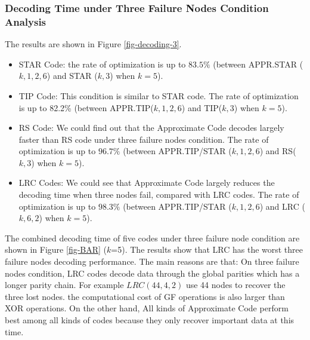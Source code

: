 \documentclass[sigconf]{acmart}
\begin{document}
\subsubsection{Decoding Time under Three Failure Nodes Condition Analysis}
The results are shown in Figure \ref{fig-decoding-3}.
\begin{itemize}
    \item STAR Code: the rate of optimization is up to $83.5\%$ (between APPR.STAR ($k,1,2,6$) and STAR ($k,3$) when $k = 5$).
    \item TIP Code: This condition is similar to STAR code. The rate of optimization is up to 82.2\% (between APPR.TIP($k,1,2,6$) and TIP($k,3$) when $k = 5$).
    \item RS Code: We could find out that the Approximate Code decodes largely faster than RS code under three failure nodes condition. The rate of optimization is up to $96.7\%$ (between APPR.TIP/STAR ($k,1,2,6$) and RS($k,3$) when $k = 5$).
    \item LRC Codes:
    We could see that Approximate Code largely reduces the decoding time when three nodes fail, compared with LRC codes. The rate of optimization is up to $98.3\%$  (between APPR.TIP/STAR ($k,1,2,6$) and LRC ($k, 6, 2$) when $k = 5$).
\end{itemize}

The combined decoding time of five codes under three failure node condition are shown in Figure \ref{fig-BAR} ($k$=5). The results show that LRC has the worst three failure nodes decoding performance. The main reasons are that: On three failure nodes condition, LRC codes decode data through the global parities which has a longer parity chain. For example $LRC (44,4,2)$ use 44 nodes to recover the three lost nodes. the computational cost of GF operations is also larger than XOR operations. On the other hand, All kinds of Approximate Code perform best among all kinds of codes because they only recover important data at this time.
\end{document}
